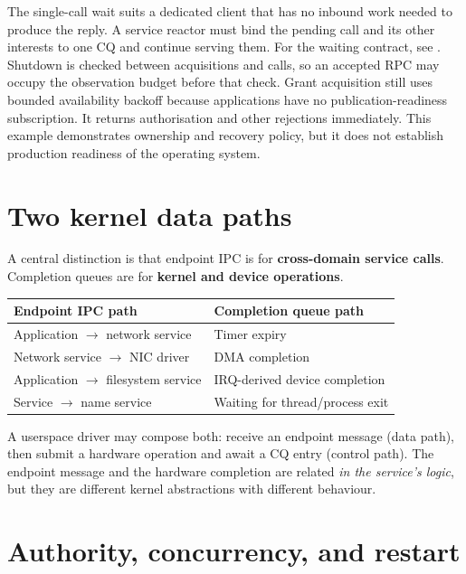 The single-call wait suits a dedicated client that has no inbound work needed to
produce the reply. A service reactor must bind the pending call and its other
interests to one CQ and continue serving them. For the waiting contract, see
. Shutdown is checked between acquisitions
and calls, so an accepted RPC may occupy the observation budget before that check.
Grant acquisition still uses bounded availability backoff because applications
have no publication-readiness subscription. It returns authorisation and other
rejections immediately. This example demonstrates ownership and recovery policy, but
it does not establish production readiness of the operating system.

\section{Two kernel data paths}

A central distinction is that endpoint IPC is for \textbf{cross-domain
service calls}. Completion queues are for \textbf{kernel and device operations}.

\begin{center}
\begin{tabular}{|l|l|}
\hline
\textbf{Endpoint IPC path} & \textbf{Completion queue path} \\
\hline
Application $\rightarrow$ network service & Timer expiry \\
Network service $\rightarrow$ NIC driver & DMA completion \\
Application $\rightarrow$ filesystem service & IRQ-derived device completion \\
Service $\rightarrow$ name service & Waiting for thread/process exit \\
\hline
\end{tabular}
\end{center}

A userspace driver may compose both: receive an endpoint message (data path), then
submit a hardware operation and await a CQ entry (control path). The endpoint
message and the hardware completion are related \emph{in the service's logic}, but
they are different kernel abstractions with different behaviour.

\section{Authority, concurrency, and restart}

